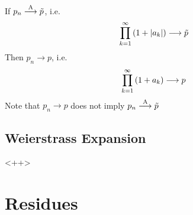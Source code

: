 \documentclass[../complete.tex]{subfiles}
\begin{document}
\begin{thm}
	If $p_n\overset{\mathrm{A}}{\longrightarrow}\tilde{p}$, i.e.
	\begin{equation*}
		\prod_{k=1}^{\infty}\left( 1+\abs{a_k} \right)\overset{}{\longrightarrow}\tilde{p}
	\end{equation*}
	Then $p_n\to p$, i.e.
	\begin{equation*}
		\prod_{k=1}^{\infty}\left( 1+a_k \right)\overset{}{\longrightarrow} p
	\end{equation*}
	Note that $p_n\to p$ does not imply $p_n\overset{\mathrm{A}}{\longrightarrow}\tilde{p}$
\end{thm}
\subsection{Weierstrass Expansion}
<++>
\section{Residues}
\end{document}

